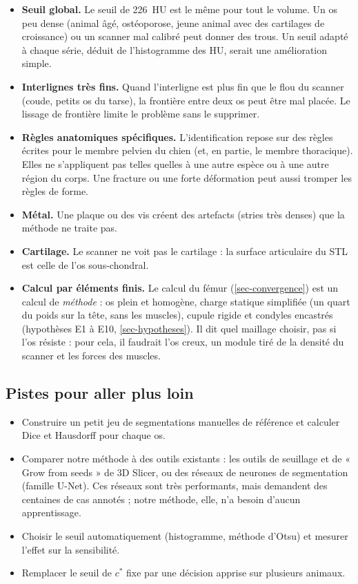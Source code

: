 \documentclass[11pt,a4paper]{article}
\begin{document}
\begin{itemize}
  \item \textbf{Seuil global.} Le seuil de 226~HU est le même pour tout le volume. Un os peu dense (animal âgé,
  ostéoporose, jeune animal avec des cartilages de croissance) ou un scanner mal calibré peut donner des trous. Un
  seuil adapté à chaque série, déduit de l'histogramme des HU, serait une amélioration simple.
  \item \textbf{Interlignes très fins.} Quand l'interligne est plus fin que le flou du scanner (coude, petits os du
  tarse), la frontière entre deux os peut être mal placée. Le lissage de frontière limite le problème sans le
  supprimer.
  \item \textbf{Règles anatomiques spécifiques.} L'identification repose sur des règles écrites pour le membre
  pelvien du chien (et, en partie, le membre thoracique). Elles ne s'appliquent pas telles quelles à une autre espèce
  ou à une autre région du corps. Une fracture ou une forte déformation peut aussi tromper les règles de forme.
  \item \textbf{Métal.} Une plaque ou des vis créent des artefacts (stries très denses) que la méthode ne traite pas.
  \item \textbf{Cartilage.} Le scanner ne voit pas le cartilage : la surface articulaire du STL est celle de l'os
  sous-chondral.
  \item \textbf{Calcul par éléments finis.} Le calcul du fémur (\cref{sec-convergence}) est un calcul de
  \emph{méthode} : os plein et homogène, charge statique simplifiée (un quart du poids sur la tête, sans les muscles),
  cupule rigide et condyles encastrés (hypothèses E1 à E10, \cref{sec-hypotheses}). Il dit quel maillage choisir, pas
  si l'os résiste : pour cela, il faudrait l'os creux, un module tiré de la densité du scanner et les forces des
  muscles.
\end{itemize}

\subsection{Pistes pour aller plus loin}

\begin{itemize}
  \item Construire un petit jeu de segmentations manuelles de référence et calculer Dice et Hausdorff pour chaque
  os.
  \item Comparer notre méthode à des outils existants : les outils de seuillage et de « Grow from seeds » de 3D Slicer,
  ou des réseaux de neurones de segmentation (famille U-Net). Ces réseaux sont très performants, mais demandent des
  centaines de cas annotés ; notre méthode, elle, n'a besoin d'aucun apprentissage.
  \item Choisir le seuil automatiquement (histogramme, méthode d'Otsu) et mesurer l'effet sur la sensibilité.
  \item Remplacer le seuil de $c^*$ fixe par une décision apprise sur plusieurs animaux.
\end{itemize}
\end{document}

